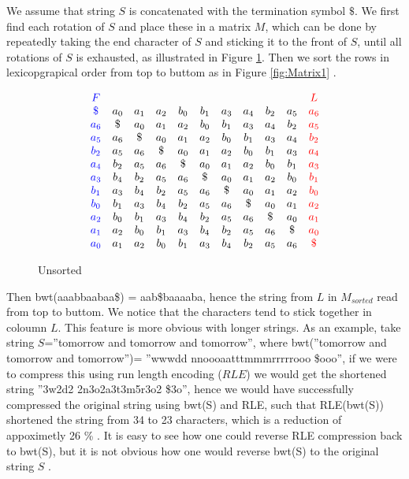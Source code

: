\documentclass[12pt]{article} %
\begin{document}
We assume that string $S$ is concatenated with the termination symbol $\$$. We first find each rotation of $S$ and place these in a matrix $M$, which can be done by repeatedly taking the end character of $S$ and sticking it to the front of $S$, until all rotations of $S$ is exhausted, as illustrated in Figure \ref{fig:Matrix0}. Then we sort the rows in lexicopgrapical order from top to buttom as in Figure \ref{fig:Matrix1} \cite{bwtfmindex}.

\begin{figure}[H]
\[
\begin{array}{*{11}c}
{\color{blue} F } &  &  & & & & & & & & {\color{red} L }  \\ 
{\color{blue} \$ } & a_0 & a_1 & a_2 & b_0 & b_1 & a_3 & a_4 & b_2 & a_5 & {\color{red} a_6 } \\
{\color{blue} a_6 } & \$ & a_0 & a_1 & a_2 & b_0 & b_1 & a_3 & a_4 & b_2 & {\color{red} a_5 }  \\
{\color{blue} a_5 } & a_6 & \$ & a_0 & a_1 & a_2 & b_0 & b_1 & a_3 & a_4 & {\color{red} b_2 } \\
{\color{blue} b_2  } & a_5 & a_6 & \$ & a_0 & a_1 & a_2 & b_0 & b_1 & a_3 & {\color{red} a_4 } \\
{\color{blue} a_4 }  & b_2 & a_5 & a_6 & \$ & a_0 & a_1 & a_2 & b_0 & b_1 & {\color{red} a_3 } \\
{\color{blue} a_3 }  & b_4 & b_2 & a_5 & a_6 & \$ & a_0 & a_1 & a_2 & b_0 & {\color{red} b_1 } \\
{\color{blue} b_1 }  & a_3 & b_4 & b_2 & a_5 & a_6 & \$ & a_0 & a_1 & a_2 & {\color{red} b_0 }  \\ 
{\color{blue} b_0 }  & b_1 & a_3 & b_4 & b_2 & a_5 & a_6 & \$ & a_0 & a_1 & {\color{red} a_2 } \\
{\color{blue} a_2 } & b_0 & b_1 & a_3 & b_4 & b_2 & a_5 & a_6 & \$ & a_0 & {\color{red} a_1 } \\
{\color{blue} a_1 } & a_2 & b_0 & b_1 & a_3 & b_4 & b_2 & a_5 & a_6 & \$ & {\color{red} a_0 }  \\
{\color{blue} a_0 } & a_1 & a_2 & b_0 & b_1 & a_3 & b_4 & b_2 & a_5 & a_6 & {\color{red} \$ } \\
\end{array}
\]
\captionsetup{width=0.8\textwidth}
\caption{Unsorted}
\label{fig:Matrix0}
\end{figure}

Then bwt(aaabbaabaa\$) = aab\$baaaaba, hence the string from $L$ in $M_{sorted}$ read from top to buttom. We notice that the characters tend to stick together in coloumn $L$. This feature is more obvious with longer strings. As an example, take string $S$=''tomorrow and tomorrow and tomorrow'', where bwt(''tomorrow and tomorrow and tomorrow'')= ''wwwdd  nnoooaatttmmmrrrrrooo  \$ooo'', if we were to compress this using run length encoding ($RLE$) we would get the shortened string ''3w2d2 2n3o2a3t3m5r3o2 \$3o'', hence we would have successfully compressed the original string using bwt(S) and RLE, such that RLE(bwt(S)) shortened the string from 34 to 23 characters, which is a reduction of appoximetly 26 \% \cite{bwtfmindex}. It is easy to see how one could reverse RLE compression back to bwt(S), but it is not obvious how one would reverse bwt(S) to the original string $S$ \cite{bwtfmindex}.
\end{document}
